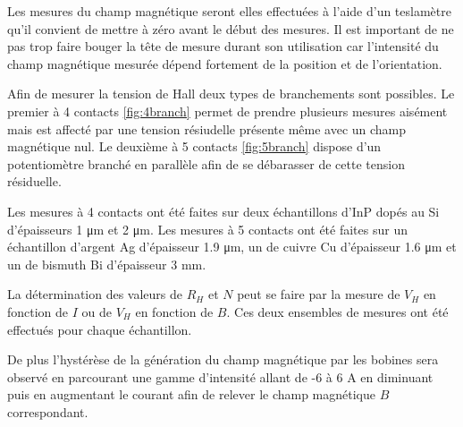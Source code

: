 \begin{minipage}{\textwidth}
    Les mesures du champ magnétique seront elles effectuées à l'aide d'un teslamètre qu'il convient de mettre à zéro avant le début des mesures. Il est important de ne pas trop faire bouger la tête de mesure durant son utilisation car l'intensité du champ magnétique mesurée dépend fortement de la position et de l'orientation.
    
    Afin de mesurer la tension de Hall deux types de branchements sont possibles. Le premier à 4 contacts \autoref{fig:4branch} permet de prendre plusieurs mesures aisément mais est affecté par une tension résiudelle présente même avec un champ magnétique nul. Le deuxième à 5 contacts \autoref{fig:5branch} dispose d'un potentiomètre branché en parallèle afin de se débarasser de cette tension résiduelle. 
\end{minipage}

Les mesures à 4 contacts ont été faites sur deux échantillons d'InP dopés au Si d'épaisseurs 1 \si{\micro\meter} et 2 \si{\micro\meter}. Les mesures à 5 contacts ont été faites sur un échantillon d'argent Ag d'épaisseur 1.9 \si{\micro \meter}, un de cuivre Cu d'épaisseur 1.6 \si{\micro \meter} et un de bismuth Bi d'épaisseur 3 \si{\milli \meter}.

La détermination des valeurs de \(R_H\) et \(N\) peut se faire par la mesure de \(V_H\) en fonction de \(I\) ou de \(V_H\) en fonction de \(B\). Ces deux ensembles de mesures ont été effectués pour chaque échantillon.

De plus l'hystérèse de la génération du champ magnétique par les bobines sera observé en parcourant une gamme d'intensité allant de -6 à 6 \si{\ampere} en diminuant puis en augmentant le courant afin de relever le champ magnétique \(B\) correspondant.
    